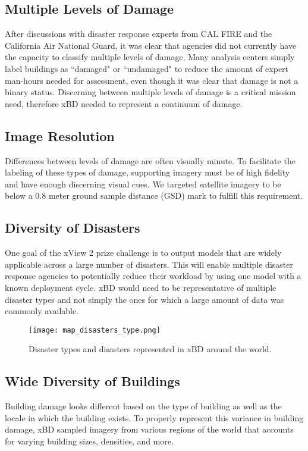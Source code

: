 \documentclass[10pt,twocolumn,letterpaper]{article}
\begin{document}
\subsection{Multiple Levels of Damage}
After discussions with disaster response experts from CAL FIRE and the California Air National Guard, it was clear that agencies did not currently have the capacity to classify multiple levels of damage.
Many analysis centers simply label buildings as ``damaged" or ``undamaged"  to reduce the amount of expert man-hours needed for assessment, even though it was clear that damage is not a binary status.
Discerning between multiple levels of damage is a critical mission need, therefore xBD needed to represent a continuum of damage.

\subsection{Image Resolution}
Differences between levels of damage are often visually minute.
To facilitate the labeling of these types of damage,  supporting imagery must be of high fidelity and have enough discerning visual cues.
We targeted satellite imagery to be below a 0.8 meter ground sample distance (GSD) mark to fulfill this requirement.

\subsection{Diversity of Disasters}
One goal of the xView 2 prize challenge is to output models that are widely applicable across a large number of disasters.
This will enable multiple disaster response agencies to potentially reduce their workload by using one model with a known deployment cycle.
xBD would need to be representative of multiple disaster types and not simply the ones for which a large amount of data was commonly available.

\begin{figure*}[ht]
	\begin{center}
		\texttt{[image: map\_disasters\_type.png]}
	\end{center}
	\caption{Disaster types and disasters represented in xBD around the world.}
	\label{fig:teaser}
\end{figure*}

\subsection{Wide Diversity of Buildings}
Building damage looks different based on the type of building as well as the locale in which the building exists.
To properly represent this variance in building damage, xBD sampled imagery from various regions of the world that accounts for varying building sizes, densities, and more.
\end{document}
